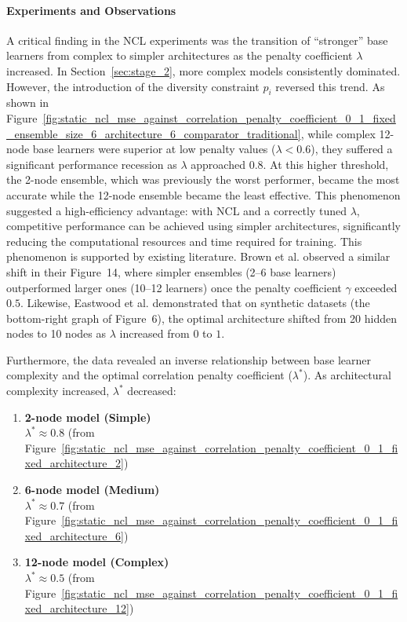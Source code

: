 \documentclass{article}
\begin{document}
\paragraph{Experiments and Observations}
A critical finding in the NCL experiments was the transition of ``stronger'' base learners from complex to simpler architectures as the penalty coefficient $\lambda$ increased. In Section~\ref{sec:stage_2}, more complex models consistently dominated. However, the introduction of the diversity constraint $p_i$ reversed this trend. As shown in Figure~\ref{fig:static_ncl_mse_against_correlation_penalty_coefficient_0_1_fixed_ensemble_size_6_architecture_6_comparator_traditional}, while complex 12-node base learners were superior at low penalty values ($\lambda < 0.6$), they suffered a significant performance recession as $\lambda$ approached $0.8$. At this higher threshold, the 2-node ensemble, which was previously the worst performer, became the most accurate while the 12-node ensemble became the least effective. This phenomenon suggested a high-efficiency advantage: with NCL and a correctly tuned $\lambda$, competitive performance can be achieved using simpler architectures, significantly reducing the computational resources and time required for training. This phenomenon is supported by existing literature. Brown et al. \cite{brown2005managing} observed a similar shift in their Figure~14, where simpler ensembles (2--6 base learners) outperformed larger ones (10--12 learners) once the penalty coefficient $\gamma$ exceeded $0.5$. Likewise, Eastwood et al. \cite{eastwood2006lambda} demonstrated that on synthetic datasets (the bottom-right graph of Figure~6), the optimal architecture shifted from 20 hidden nodes to 10 nodes as $\lambda$ increased from $0$ to $1$. 

Furthermore, the data revealed an inverse relationship between base learner complexity and the optimal correlation penalty coefficient ($\lambda^*$). As architectural complexity increased, $\lambda^*$ decreased: 

\begin{enumerate}
    \item \textbf{2-node model (Simple)} \\
    $\lambda^* \approx 0.8$ (from Figure~\ref{fig:static_ncl_mse_against_correlation_penalty_coefficient_0_1_fixed_architecture_2})

    \item \textbf{6-node model (Medium)} \\
    $\lambda^* \approx 0.7$ (from Figure~\ref{fig:static_ncl_mse_against_correlation_penalty_coefficient_0_1_fixed_architecture_6})

    \item \textbf{12-node model (Complex)} \\
    $\lambda^* \approx 0.5$ (from Figure~\ref{fig:static_ncl_mse_against_correlation_penalty_coefficient_0_1_fixed_architecture_12})
\end{enumerate}
\end{document}
